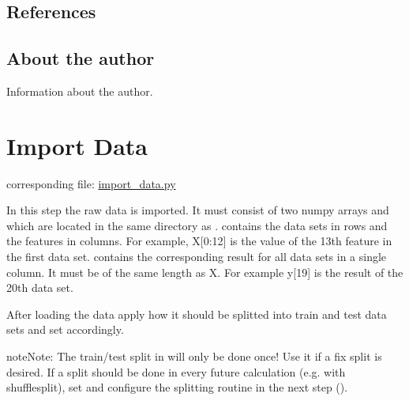 \documentclass[letterpaper,10pt,english]{sphinxmanual}
\begin{document}
\subsection{References}
\label{\detokenize{Overview:references}}

\subsection{About the author}
\label{\detokenize{Overview:about-the-author}}
Information about the author.
\label{\detokenize{Overview:blank}}\begin{figure}[htbp]
\centering

\noindent{}
\label{\detokenize{Overview:blank}}\end{figure}


\section{Import Data}
\label{\detokenize{Importing_Data:import-data}}\label{\detokenize{Importing_Data::doc}}\label{\detokenize{Importing_Data:id1}}
corresponding file: \href{https://github.com/weinertmos/ForestFire/blob/master/source/ForestFire/import\_data.py}{import\_data.py}

In this step the raw data is imported.
It must consist of two numpy arrays  and  which are located in the same directory as .
 contains the data sets in rows and the features in columns.
For example, X{[}0:12{]} is the value of the 13th feature in the first data set.
 contains the corresponding result for all data sets in a single column.
It must be of the same length as X.
For example y{[}19{]} is the result of the 20th data set.

After loading the data apply how it should be splitted into train and test data sets and set  accordingly.

\begin{sphinxadmonition}{note}{Note:}
The train/test split in  will only be done once!
Use it if a fix split is desired.
If a split should be done in every future calculation (e.g. with shufflesplit),
set  and configure the splitting routine
in the next step ({\hyperref[\detokenize{Generate_Database:compute}]{}}).
\end{sphinxadmonition}
\end{document}
